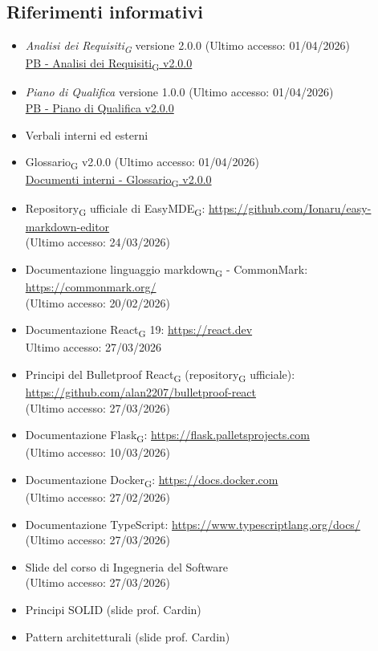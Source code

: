 \documentclass[11pt,a4paper]{article}
\newcommand{\gls}[1]{#1\textsubscript{G}}
\begin{document}
\subsection{Riferimenti informativi}
\begin{itemize}
    \item \textit{\gls{Analisi dei Requisiti}} versione 2.0.0 (Ultimo accesso: 01/04/2026)\\
    \href{https://byteme25.github.io/ByteMe/}{PB - \gls{Analisi dei Requisiti} v2.0.0}
    \item \textit{Piano di Qualifica} versione 1.0.0 (Ultimo accesso: 01/04/2026) \\
    \href{https://byteme25.github.io/ByteMe/}{PB - Piano di Qualifica v2.0.0}
    \item Verbali interni ed esterni
    \item \gls{Glossario} v2.0.0 (Ultimo accesso: 01/04/2026)\\
    \href{https://byteme25.github.io/ByteMe/files.html}{Documenti interni - \gls{Glossario} v2.0.0}
    \item \gls{Repository} ufficiale di \gls{EasyMDE}: \url{https://github.com/Ionaru/easy-markdown-editor}\\ (Ultimo accesso: 24/03/2026)
     \item Documentazione linguaggio \gls{markdown} - CommonMark: \url{https://commonmark.org/}\\ (Ultimo accesso: 20/02/2026)
    \item Documentazione \gls{React} 19: \url{https://react.dev}\\ Ultimo accesso: 27/03/2026
    \item Principi del Bulletproof \gls{React} (\gls{repository} ufficiale): \url{https://github.com/alan2207/bulletproof-react}\\ (Ultimo accesso: 27/03/2026)
    \item Documentazione \gls{Flask}: \url{https://flask.palletsprojects.com}\\ (Ultimo accesso: 10/03/2026)
    \item Documentazione \gls{Docker}: \url{https://docs.docker.com}\\ (Ultimo accesso: 27/02/2026)
    \item Documentazione TypeScript: \url{https://www.typescriptlang.org/docs/}\\ (Ultimo accesso: 27/03/2026)

    \item Slide del corso di Ingegneria del Software\\ (Ultimo accesso: 27/03/2026)
    \item Principi SOLID (slide prof. Cardin)
    \item Pattern architetturali (slide prof. Cardin)
\end{itemize}
\end{document}
